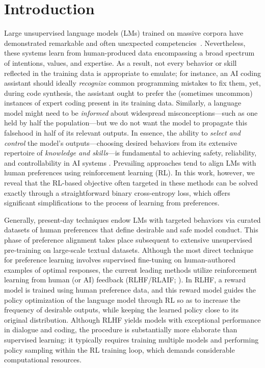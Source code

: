 \section{Introduction}
Large unsupervised language models (LMs) trained on massive corpora have demonstrated remarkable and often unexpected competencies~\citep{chowdhery2022palm, brown2020language, touvron2023llama,bubeck2023sparks}. Nevertheless, these systems learn from human-produced data encompassing a broad spectrum of intentions, values, and expertise. As a result, not every behavior or skill reflected in the training data is appropriate to emulate; for instance, an AI coding assistant should ideally \textit{recognize} common programming mistakes to fix them, yet, during code synthesis, the assistant ought to prefer the (sometimes uncommon) instances of expert coding present in its training data. Similarly, a language model might need to be \textit{informed} about widespread misconceptions—such as one held by half the population—but we do not want the model to propagate this falsehood in half of its relevant outputs. In essence, the ability to \emph{select and control} the model’s outputs—choosing desired behaviors from its extensive repertoire of \textit{knowledge and skills}—is fundamental to achieving safety, reliability, and controllability in AI systems \citep{ouyang2022training}. Prevailing approaches tend to align LMs with human preferences using reinforcement learning (RL). In this work, however, we reveal that the RL-based objective often targeted in these methods can be solved exactly through a straightforward binary cross-entropy loss, which offers significant simplifications to the process of learning from preferences.

Generally, present-day techniques endow LMs with targeted behaviors via curated datasets of human preferences that define desirable and safe model conduct. This phase of preference alignment takes place subsequent to extensive unsupervised pre-training on large-scale textual datasets. Although the most direct technique for preference learning involves supervised fine-tuning on human-authored examples of optimal responses, the current leading methods utilize reinforcement learning from human (or AI) feedback (RLHF/RLAIF; \citep{christiano2017deep,bai2022constitutional}). In RLHF, a reward model is trained using human preference data, and this reward model guides the policy optimization of the language model through RL so as to increase the frequency of desirable outputs, while keeping the learned policy close to its original distribution. Although RLHF yields models with exceptional performance in dialogue and coding, the procedure is substantially more elaborate than supervised learning: it typically requires training multiple models and performing policy sampling within the RL training loop, which demands considerable computational resources.

